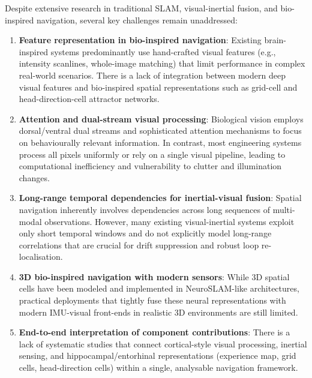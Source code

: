 Despite extensive research in traditional SLAM, visual-inertial fusion, and bio-inspired navigation, several key challenges remain unaddressed:

\begin{enumerate}
    \item \textbf{Feature representation in bio-inspired navigation}: Existing brain-inspired systems predominantly use hand-crafted visual features (e.g., intensity scanlines, whole-image matching) that limit performance in complex real-world scenarios. There is a lack of integration between modern deep visual features and bio-inspired spatial representations such as grid-cell and head-direction-cell attractor networks.
    
    \item \textbf{Attention and dual-stream visual processing}: Biological vision employs dorsal/ventral dual streams and sophisticated attention mechanisms to focus on behaviourally relevant information. In contrast, most engineering systems process all pixels uniformly or rely on a single visual pipeline, leading to computational inefficiency and vulnerability to clutter and illumination changes.
    
    \item \textbf{Long-range temporal dependencies for inertial-visual fusion}: Spatial navigation inherently involves dependencies across long sequences of multi-modal observations. However, many existing visual-inertial systems exploit only short temporal windows and do not explicitly model long-range correlations that are crucial for drift suppression and robust loop re-localisation.
    
    \item \textbf{3D bio-inspired navigation with modern sensors}: While 3D spatial cells have been modeled and implemented in NeuroSLAM-like architectures, practical deployments that tightly fuse these neural representations with modern IMU-visual front-ends in realistic 3D environments are still limited.
    
    \item \textbf{End-to-end interpretation of component contributions}: There is a lack of systematic studies that connect cortical-style visual processing, inertial sensing, and hippocampal/entorhinal representations (experience map, grid cells, head-direction cells) within a single, analysable navigation framework.
\end{enumerate}

